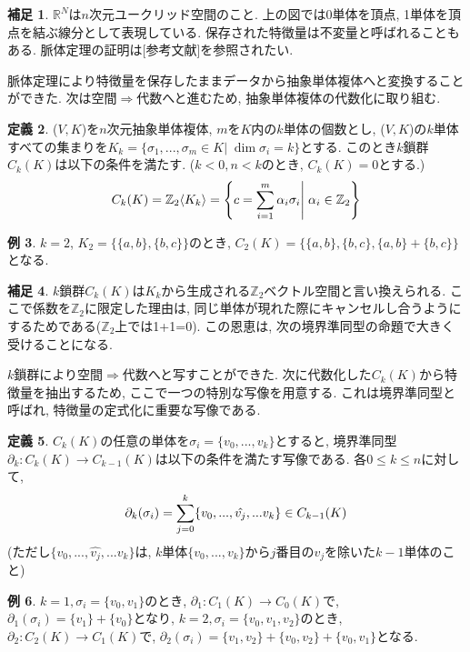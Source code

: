 \documentclass[a4paper]{jsarticle}
\theoremstyle{definition}
\newtheorem{dfn}{定義}[section]
\newtheorem{exam}[dfn]{例}
\newtheorem{hsk}[dfn]{補足}
\begin{document}
\begin{hsk}
$\mathbb{R}^N$は$n$次元ユークリッド空間のこと. 上の図では0単体を頂点, 1単体を頂点を結ぶ線分として表現している. 保存された特徴量は不変量と呼ばれることもある. 脈体定理の証明は[参考文献]を参照されたい. \\    
\end{hsk}
脈体定理により特徴量を保存したままデータから抽象単体複体へと変換することができた. 次は空間$\Rightarrow$代数へと進むため, 抽象単体複体の代数化に取り組む. \\
\begin{dfn}
($V,K$)を$n$次元抽象単体複体, $m$を$K$内の$k$単体の個数とし, ($V,K$)の$k$単体すべての集まりを$K_k=\{\sigma_1,...,\sigma_m\in K | \; \dim\sigma_i=k \}$とする. このとき$k$鎖群$C_k(K)$は以下の条件を満たす. ($k<0, n<k$のとき, $C_k(K)=0$とする.)
\begin{equation}
   C_k(K)= \mathbb{Z}_2\langle K_k\rangle = \left\{ c=\sum_{i=1}^{m}\alpha_i\sigma_i \middle| \; \alpha_i\in\mathbb{Z}_2 \right\} 
 \notag
\end{equation}
\end{dfn}
\begin{exam}
    $k=2$, $K_2=\{ \{a,b\}, \{b,c\} \}$のとき, $C_2(K)=\{ \{a,b\}, \{b,c\}, \{a,b\}+\{b,c\} \}$となる.
\end{exam}
\begin{hsk}
    $k$鎖群$C_k(K)$は$K_k$から生成される$\mathbb{Z}_2$ベクトル空間と言い換えられる. ここで係数を$\mathbb{Z}_2$に限定した理由は, 同じ単体が現れた際にキャンセルし合うようにするためである($\mathbb{Z}_2$上では1+1=0). この恩恵は, 次の境界準同型の命題で大きく受けることになる. \\
\end{hsk}
    $k$鎖群により空間$\Rightarrow$代数へと写すことができた. 次に代数化した$C_k(K)$から特徴量を抽出するため, ここで一つの特別な写像を用意する. これは境界準同型と呼ばれ, 特徴量の定式化に重要な写像である.
\begin{dfn}
  $C_k(K)$の任意の単体を$\sigma_i=\{v_0,...,v_k\}$とすると, 境界準同型$\partial_k:C_k(K)\rightarrow C_{k-1}(K)$は以下の条件を満たす写像である. 各$0\leq k\leq n$に対して, 
\begin{equation}
    \partial_k(\sigma_i)=\sum_{j=0}^{k} \{v_0,...,\hat{v_j},...v_k\} \in C_{k-1}(K) \notag
\end{equation}  
(ただし$\{v_0,...,\hat{v_j},...v_k\}$は, $k$単体$\{v_0,...,v_k\}$から$j$番目の$v_j$を除いた$k-1$単体のこと)
\end{dfn}  
\begin{exam}
    $k=1, \sigma_i=\{v_0,v_1\}$のとき, $\partial_1:C_1(K)\rightarrow C_0(K)$で, $\partial_1(\sigma_i)=\{v_1\}+\{v_0\}$となり, $k=2, \sigma_i=\{v_0,v_1,v_2\}$のとき, $\partial_2:C_2(K)\rightarrow C_1(K)$で, $\partial_2(\sigma_i)=\{v_1,v_2\}+\{v_0,v_2\}+\{v_0,v_1\}$となる. 
\end{exam}  
\end{document}
